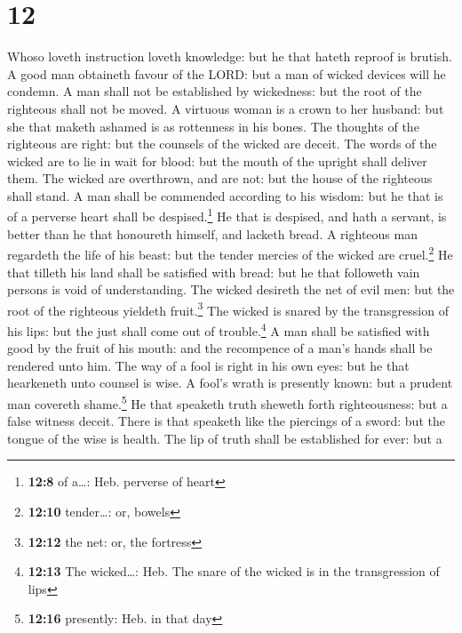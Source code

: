 \hypertarget{section-11}{%
\section{12}\label{section-11}}

 Whoso loveth instruction loveth knowledge: but he that
hateth reproof is brutish.  A good man obtaineth favour of
the LORD: but a man of wicked devices will he condemn.  A
man shall not be established by wickedness: but the root of the
righteous shall not be moved.  A virtuous woman is a crown
to her husband: but she that maketh ashamed is as rottenness in his
bones.  The thoughts of the righteous are right: but the
counsels of the wicked are deceit.  The words of the
wicked are to lie in wait for blood: but the mouth of the upright shall
deliver them.  The wicked are overthrown, and are not: but
the house of the righteous shall stand.  A man shall be
commended according to his wisdom: but he that is of a perverse heart
shall be despised.\footnote{\textbf{12:8} of a\ldots: Heb. perverse of
  heart}  He that is despised, and hath a servant, is
better than he that honoureth himself, and lacketh bread.
 A righteous man regardeth the life of his beast: but the
tender mercies of the wicked are cruel.\footnote{\textbf{12:10}
  tender\ldots: or, bowels}  He that tilleth his land
shall be satisfied with bread: but he that followeth vain persons is
void of understanding.  The wicked desireth the net of
evil men: but the root of the righteous yieldeth fruit.\footnote{\textbf{12:12}
  the net: or, the fortress}  The wicked is snared by the
transgression of his lips: but the just shall come out of
trouble.\footnote{\textbf{12:13} The wicked\ldots: Heb. The snare of the
  wicked is in the transgression of lips}  A man shall be
satisfied with good by the fruit of his mouth: and the recompence of a
man's hands shall be rendered unto him.  The way of a
fool is right in his own eyes: but he that hearkeneth unto counsel is
wise.  A fool's wrath is presently known: but a prudent
man covereth shame.\footnote{\textbf{12:16} presently: Heb. in that day}
 He that speaketh truth sheweth forth righteousness: but
a false witness deceit.  There is that speaketh like the
piercings of a sword: but the tongue of the wise is health.
 The lip of truth shall be established for ever: but a
